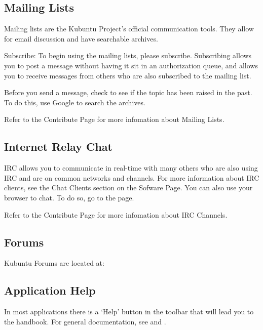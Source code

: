 \documentclass[letterpaper,10pt,english]{sphinxmanual}
\begin{document}
\subsection{Mailing Lists}
\label{\detokenize{docs/support:mailing-lists}}
Mailing lists are the Kubuntu Project's official communication tools. They allow for email discussion and have searchable archives.

Subscribe:
To begin using the mailing lists, please subscribe. Subscribing allows you to post a message without having it sit in an authorization queue, and allows you to receive messages from others who are also subscribed to the mailing list.

Before you send a message, check to see if the topic has been raised in the past. To do this, use Google to search the archives.

Refer to the Contribute Page for more infomation about Mailing Lists.


\subsection{Internet Relay Chat}
\label{\detokenize{docs/support:internet-relay-chat}}
IRC allows you to communicate in real-time with many others who are also using IRC and are on common networks and channels. For more information about IRC clients, see the Chat Clients section on the Sofware Page. You can also use your browser to chat. To do so, go to the  page.

Refer to the Contribute Page for more infomation about IRC Channels.


\subsection{Forums}
\label{\detokenize{docs/support:forums}}
Kubuntu Forums are located at: 


\subsection{Application Help}
\label{\detokenize{docs/support:application-help}}
In most  applications there is a `Help' button in the toolbar that will lead you to the handbook. For general  documentation, see  and .
\end{document}
